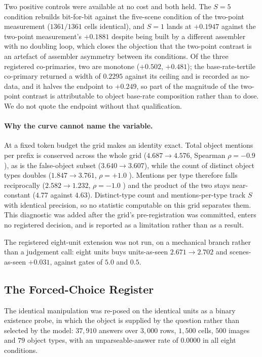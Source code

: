 Two positive controls were available at no cost and both held. The $S{=}5$ condition rebuilds
bit-for-bit against the five-scene condition of the two-point measurement ($1361/1361$ cells identical), and
$S{=}1$ lands at $+0.1947$ against the two-point measurement's $+0.1881$ despite being built by a different
assembler with no doubling loop, which closes the objection that the two-point contrast is an
artefact of assembler asymmetry between its conditions. Of the three registered co-primaries, two
are monotone ($+0.502$, $+0.481$); the base-rate-tertile co-primary returned a width of $0.2295$
against its ceiling and is recorded as no-data, and it halves the endpoint to $+0.249$, so part of
the magnitude of the two-point contrast is attributable to object base-rate composition rather than
to dose. We do not quote the endpoint without that qualification.

\paragraph{Why the curve cannot name the variable.} At a fixed token budget the grid makes an
identity exact. Total object mentions per prefix is conserved across the whole grid
($4.687 \rightarrow 4.576$, Spearman $\rho = -0.9$ ), as is the false-object subset
($3.640 \rightarrow 3.607$), while the count of distinct object types doubles
($1.847 \rightarrow 3.761$, $\rho = +1.0$ ). Mentions per type therefore falls
reciprocally ($2.582 \rightarrow 1.232$, $\rho = -1.0$ ) and the product of the two
stays near-constant ($4.77$ against $4.63$). Distinct-type count and mentions-per-type track $S$ with
identical precision, so no statistic computable on this grid separates them. This diagnostic was
added after the grid's pre-registration was committed, enters no registered decision, and is reported as a
limitation rather than as a result.

The registered eight-unit extension was not run, on a mechanical branch rather than a judgement call:
eight units buys units-as-seen $2.671 \rightarrow 2.702$ and scenes-as-seen $+0.031$, against gates
of $5.0$ and $0.5$.

\subsection{The Forced-Choice Register}
\label{app:register}

The identical manipulation was re-posed on the identical units as a binary existence probe, in which
the object is supplied by the question rather than selected by the model:
$37{,}910$ answers over $3{,}000$ rows, $1{,}500$ cells, $500$ images and $79$ object types, with an
unparseable-answer rate of $0.0000$ in all eight conditions.

